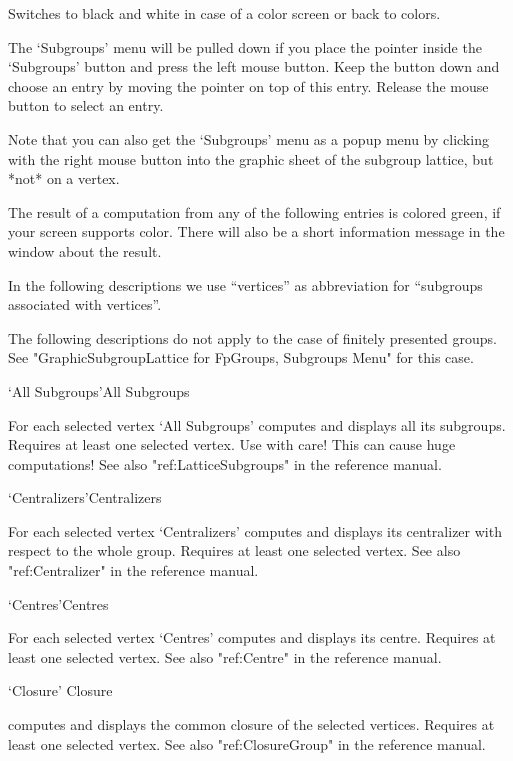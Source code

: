 Switches to black and white in case of a color screen or back to colors.



The `Subgroups' menu will be pulled down  if you place the pointer inside
the `Subgroups' button and press the left mouse  button.  Keep the button
down and choose an entry   by moving the pointer  on  top of this  entry.
Release the mouse button to select an entry.

Note that you can also get the `Subgroups' menu as a popup menu by
clicking with the right mouse button into the graphic sheet of the subgroup
lattice, but *not* on a vertex.

The result   of a computation from   any of the  following  entries is
colored green, if your screen supports color.  There will also be a short
information message in the {\GAP} window about the result.

In the following descriptions   we use ``vertices'' as abbreviation  for
``subgroups associated with vertices''.

The following descriptions do not apply to the case of finitely presented
groups. See "GraphicSubgroupLattice for FpGroups, Subgroups Menu" for this
case. 

\>`All Subgroups'{All Subgroups}

For each selected vertex `All Subgroups' computes and displays all its
subgroups. Requires at least one selected vertex. Use with care! This can
cause huge computations!  See also "ref:LatticeSubgroups" in the {\GAP}
reference manual.

\>`Centralizers'{Centralizers}

For each selected vertex `Centralizers' computes and displays its
centralizer with respect to the whole group.  Requires at least one
selected vertex.  See also "ref:Centralizer" in the {\GAP}
reference manual.

\>`Centres'{Centres}

For each selected vertex `Centres' computes and displays its centre.
Requires at least one selected vertex. See also "ref:Centre" in the {\GAP}
reference manual.

\>`Closure' {Closure}

computes and displays the common closure of the selected vertices.
Requires at least one selected vertex. See also "ref:ClosureGroup" in the
{\GAP} reference manual.

